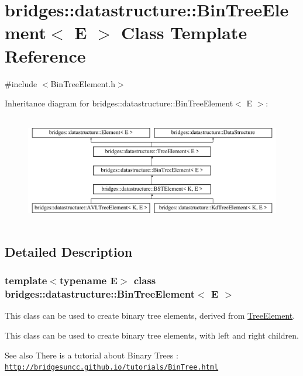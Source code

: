 \hypertarget{classbridges_1_1datastructure_1_1_bin_tree_element}{}\section{bridges\+:\+:datastructure\+:\+:Bin\+Tree\+Element$<$ E $>$ Class Template Reference}
\label{classbridges_1_1datastructure_1_1_bin_tree_element}


{\ttfamily \#include $<$Bin\+Tree\+Element.\+h$>$}

Inheritance diagram for bridges\+:\+:datastructure\+:\+:Bin\+Tree\+Element$<$ E $>$\+:\begin{figure}[H]
\begin{center}
\leavevmode
\includegraphics[height=4.794520cm]{classbridges_1_1datastructure_1_1_bin_tree_element}
\end{center}
\end{figure}


\subsection{Detailed Description}
\subsubsection*{template$<$typename E$>$\newline
class bridges\+::datastructure\+::\+Bin\+Tree\+Element$<$ E $>$}

This class can be used to create binary tree elements, derived from \hyperlink{classbridges_1_1datastructure_1_1_tree_element}{Tree\+Element}. 

This class can be used to create binary tree elements, with left and right children.

\begin{DoxySeeAlso}{See also}
There is a tutorial about Binary Trees \+: \href{http://bridgesuncc.github.io/tutorials/BinTree.html}{\tt http\+://bridgesuncc.\+github.\+io/tutorials/\+Bin\+Tree.\+html}
\end{DoxySeeAlso}

